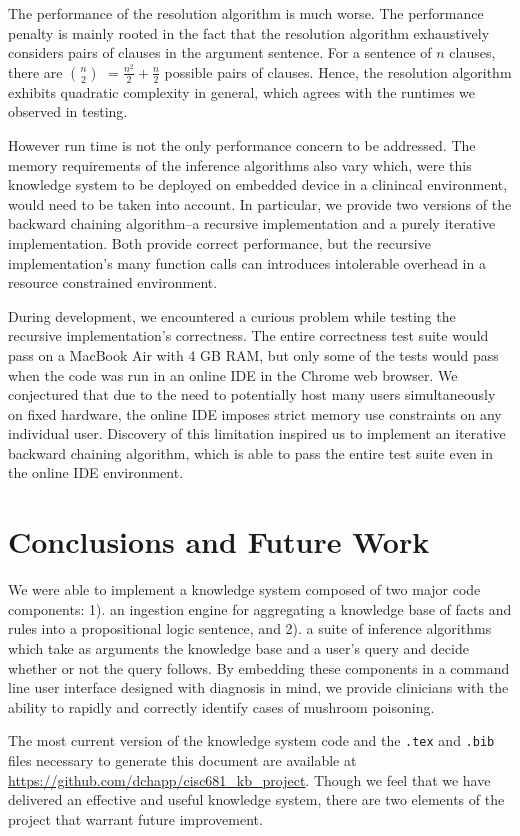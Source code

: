 \documentclass[12pt, conference, compsocconf]{IEEEtran}
\begin{document}
The performance of the resolution algorithm is much worse. 
The performance penalty is mainly rooted in the fact that the resolution algorithm exhaustively considers pairs of clauses in the argument sentence. 
For a sentence of $n$ clauses, there are $n \choose 2$ $= \frac{n^2}{2} + \frac{n}{2}$ possible pairs of clauses. 
Hence, the resolution algorithm exhibits quadratic complexity in general, which agrees with the runtimes we observed in testing. 

However run time is not the only performance concern to be addressed. 
The memory requirements of the inference algorithms also vary which, were this knowledge system to be deployed on embedded device in a clinincal environment, would need to be taken into account. 
In particular, we provide two versions of the backward chaining algorithm--a recursive implementation and a purely iterative implementation. 
Both provide correct performance, but the recursive implementation's many function calls can introduces intolerable overhead in a resource constrained environment. 

During development, we encountered a curious problem while testing the recursive implementation's correctness.
The entire correctness test suite would pass on a MacBook Air with 4 GB RAM, but only some of the tests would pass when the code was run in an online IDE in the Chrome web browser.
We conjectured that due to the need to potentially host many users simultaneously on fixed hardware, the online IDE imposes strict memory use constraints on any individual user. 
Discovery of this limitation inspired us to implement an iterative backward chaining algorithm, which is able to pass the entire test suite even in the online IDE environment. 


\section{Conclusions and Future Work}
We were able to implement a knowledge system composed of two major code components: 1). an ingestion engine for aggregating a knowledge base of facts and rules into a propositional logic sentence, and 2). a suite of inference algorithms which take as arguments the knowledge base and a user's query and decide whether or not the query follows. 
By embedding these components in a command line user interface designed with diagnosis in mind, we provide clinicians with the ability to rapidly and correctly identify cases of mushroom poisoning. 

The most current version of the knowledge system code and the \texttt{.tex} and \texttt{.bib} files necessary to generate this document are available at \url{https://github.com/dchapp/cisc681_kb_project}. 
Though we feel that we have delivered an effective and useful knowledge system, there are two elements of the project that warrant future improvement. 
\end{document}
